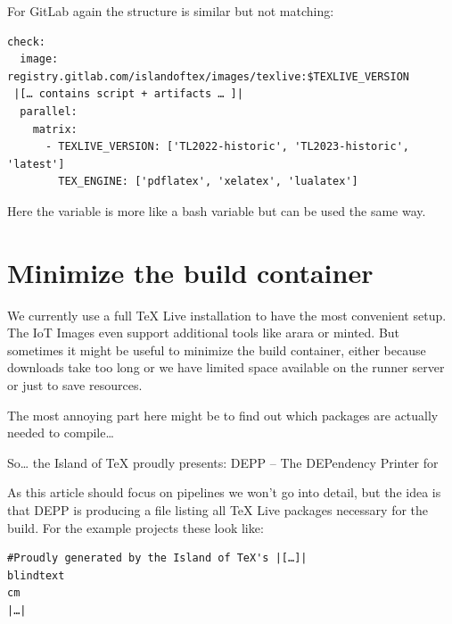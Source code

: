 \documentclass[final]{ltugboat}
\newcommand*{\TeXLive}{\acro{\TeX\,Live}}
\begin{document}

For GitLab again the structure is similar but not matching:

\begin{verbatim}
check:
  image: registry.gitlab.com/islandoftex/images/texlive:$TEXLIVE_VERSION
 |[… contains script + artifacts … ]|
  parallel:
    matrix:
      - TEXLIVE_VERSION: ['TL2022-historic', 'TL2023-historic', 'latest']
        TEX_ENGINE: ['pdflatex', 'xelatex', 'lualatex']
\end{verbatim}

Here the variable is more like a bash variable but can be used the same way.


\section{Minimize the build container}
We currently use a full TeX Live installation to have the most convenient setup.
The IoT Images even support additional tools like arara or minted.
But sometimes it might be useful to minimize the build container, either because downloads take too long or we have limited space available on the runner server or just to save resources.

The most annoying part here might be to find out which packages are actually needed to compile…

So… the Island of TeX proudly presents: DEPP – The DEPendency Printer for \TeXLive\cite{depp}

As this article should focus on pipelines we won't go into detail, but the idea is that DEPP is producing a file listing all TeX Live packages necessary for the build.
For the example projects these look like:

\begin{verbatim}
#Proudly generated by the Island of TeX's |[…]|
blindtext
cm
|…|
\end{verbatim}
\end{document}
